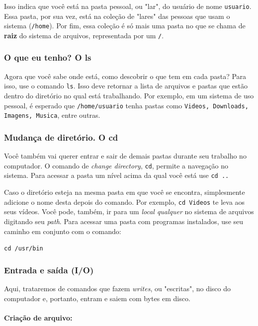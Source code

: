 \documentclass{article}
\begin{document}
	Isso indica que você está na pasta pessoal, ou "lar", do usuário de nome \texttt{usuario}. Essa pasta, por sua vez, está 
	na coleção de "lares" das pessoas que usam o sistema (\texttt{/home}). Por fim, essa coleção é só mais uma pasta no que 
	se chama de \textbf{raiz} do sistema de arquivos, representada por um \texttt{/}. 

	\subsubsection{O que eu tenho? O ls} 

	Agora que você sabe onde está, como descobrir o que tem em cada pasta? Para isso, use o comando \texttt{ls}. Isso deve
	retornar a lista de arquivos e pastas que estão dentro do diretório no qual está trabalhando. Por exemplo, em um sistema
	de uso pessoal, é esperado que \texttt{/home/usuario} tenha pastas como \texttt{Videos, Downloads, Imagens, Musica}, entre
	outras. 
	
	\subsubsection{Mudança de diretório. O cd} 

	Você também vai querer entrar e sair de demais pastas durante seu trabalho no computador. O comando de \textit{change
	directory}, \texttt{cd}, permite a navegação no sistema. Para acessar a pasta um nível acima da qual você está use 
	\texttt{cd ..} 


	Caso o diretório esteja na mesma pasta em que você se encontra, simplesmente adicione o nome desta depois do comando. 
	Por exemplo, \texttt{cd Videos} te leva aos seus vídeos. Você pode, também, ir para um \textit{local qualquer} no sistema
	de arquivos digitando seu \textit{path}. Para acessar uma pasta com programas instalados, use seu caminho em conjunto 
	com o comando: 
	
	\vspace{1ex}
	\texttt{cd /usr/bin} 
	\vspace{1ex}

	\subsubsection{Entrada e saída (I/O)}

	Aqui, trataremos de comandos que fazem \textit{writes}, ou "escritas", no disco do computador e, portanto, entram e saiem
	com bytes em disco. 

	\paragraph{Criação de arquivo:} 
\end{document}
